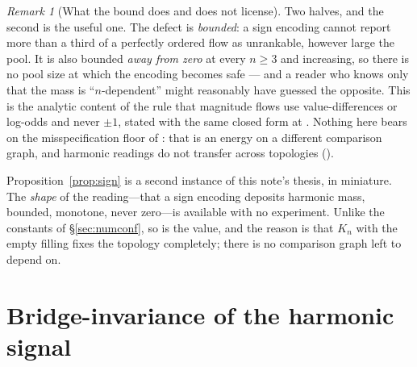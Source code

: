 \documentclass[11pt,a4paper]{article}
\theoremstyle{definition}
\theoremstyle{remark}
\newtheorem{remark}{Remark}
\begin{document}
\begin{remark}[What the bound does and does not license]\label{rem:boundlicense}
Two halves, and the second is the useful one. The defect is \emph{bounded}: a sign encoding cannot report more than a third of a perfectly ordered flow as unrankable, however large the pool. It is also bounded \emph{away from zero} at every $n\ge3$ and increasing, so there is no pool size at which the encoding becomes safe --- and a reader who knows only that the mass is ``$n$-dependent'' might reasonably have guessed the opposite. This is the analytic content of the rule that magnitude flows use value-differences or log-odds and never $\pm1$, stated with the same closed form at \cite[\S2, Observation 1]{bradsher2026}. Nothing here bears on the misspecification floor of \cite[\S4]{bradsher2026}: that is an energy on a different comparison graph, and harmonic readings do not transfer across topologies (\cite[Principle 3]{bradsher2026}).
\end{remark}

Proposition~\ref{prop:sign} is a second instance of this note's thesis, in miniature. The \emph{shape} of the reading---that a sign encoding deposits harmonic mass, bounded, monotone, never zero---is available with no experiment. Unlike the constants of \S\ref{sec:numconf}, so is the value, and the reason is that $K_n$ with the empty filling fixes the topology completely; there is no comparison graph left to depend on.

\section{Bridge-invariance of the harmonic signal}
\end{document}
